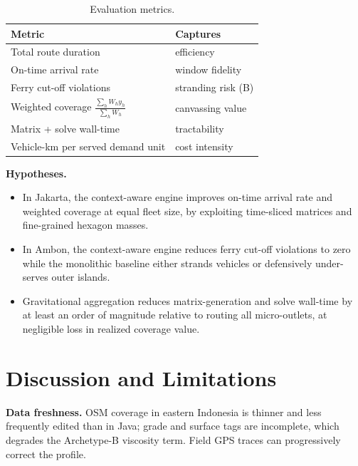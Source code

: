 \documentclass[11pt,a4paper,twocolumn]{article}
\begin{document}
\begin{table}[t]
  \centering
  \small
  \caption{Evaluation metrics.}
  \label{tab:metrics}
  \begin{tabular}{@{}ll@{}}
    \toprule
    \textbf{Metric} & \textbf{Captures} \\
    \midrule
    Total route duration & efficiency \\
    On-time arrival rate & window fidelity \\
    Ferry cut-off violations & stranding risk (B) \\
    Weighted coverage $\frac{\sum_h W_h y_h}{\sum_h W_h}$ & canvassing value \\
    Matrix + solve wall-time & tractability \\
    Vehicle-km per served demand unit & cost intensity \\
    \bottomrule
  \end{tabular}
\end{table}

\textbf{Hypotheses.}
\begin{itemize}[leftmargin=2.6em, itemsep=0.1em]
  \item[\textbf{H1.}] In Jakarta, the context-aware engine improves
    on-time arrival rate and weighted coverage at equal fleet size, by
    exploiting time-sliced matrices and fine-grained hexagon masses.
  \item[\textbf{H2.}] In Ambon, the context-aware engine reduces ferry
    cut-off violations to zero while the monolithic baseline either
    strands vehicles or defensively under-serves outer islands.
  \item[\textbf{H3.}] Gravitational aggregation reduces matrix-generation
    and solve wall-time by at least an order of magnitude relative to
    routing all micro-outlets, at negligible loss in realized coverage
    value.
\end{itemize}

\section{Discussion and Limitations}
\label{sec:discussion}

\textbf{Data freshness.} OSM coverage in eastern Indonesia is thinner and
less frequently edited than in Java; grade and surface tags are
incomplete, which degrades the Archetype-B viscosity term. Field GPS
traces can progressively correct the profile.
\end{document}
